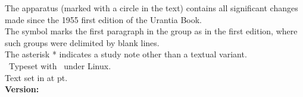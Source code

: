 \begin{center}
{The apparatus (marked with a circle in the text) contains all significant changes made since the 1955 first edition of the Urantia Book.\\
The symbol \pc{} marks the first paragraph in the group as in the first edition, where such groups were delimited by blank lines.\\
The asterisk * indicates a study note other than a textual variant.\\[5pt]
\tux\ Typeset with \XeLaTeX\ under Linux.\\
Text set in \textbf{\urantiamainfont} at \urantiamainfontsize pt.\\[18pt]
\upshape\small\bfseries Version: \mytoday{}\\
}
\end{center}

\titleframe
